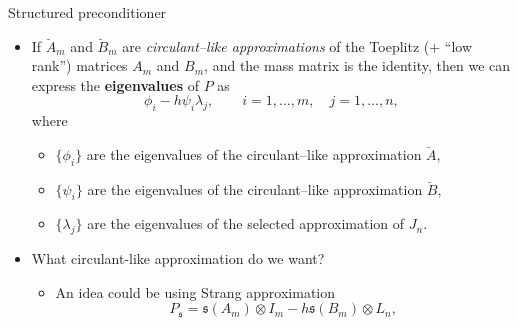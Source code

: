 \documentclass[aspectratio=169,xcolor=dvipsnames]{beamer}
\begin{document}
\begin{frame}{Structured preconditioner}

\begin{itemize}
	\item[\faLightbulb] If $\breve{A}_m$ and $\breve{B}_m$ are \emph{circulant--like approximations} of the Toeplitz (+ ``low rank'') matrices $A_m$ and $B_m$, and the mass matrix is the identity, then we can express the \textbf{eigenvalues} of $P$ as
	\begin{equation*}
		\phi_i - h \psi_i \lambda_j, \qquad i = 1,\ldots,m, \quad j=1,\ldots,n,
	\end{equation*}
	where
	\begin{itemize}
		\item[\faWrench]\normalsize $\{\phi_i\}$ are the eigenvalues of the circulant--like approximation
		$\breve{A}$,
		\item[\faWrench]\normalsize $\{\psi_i\}$ are the eigenvalues of the circulant--like approximation $\breve{B}$,
		\item[\faWrench]\normalsize $\{\lambda_j\}$ are the eigenvalues of
		the selected approximation of $J_n$.
	\end{itemize}
	\item[\faQuestionCircle]<2-> What circulant-like approximation do we want?
	\begin{itemize}
		\item[\faCog]<3-> An idea could be using Strang approximation~\parencite{MR3272165}
		\[
		P_\mathfrak{s} = \mathfrak{s}(A_m)\otimes I_m - h \mathfrak{s}(B_m)\otimes L_n,
		\]
	\end{itemize}
\end{itemize}
                                                                                                                                                                        
\end{frame}
\end{document}
